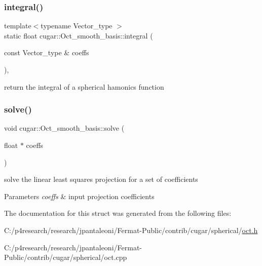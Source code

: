 \subsubsection{\texorpdfstring{integral()}{integral()}\hspace{0.1cm}{\footnotesize\ttfamily [2/2]}}
{\footnotesize\ttfamily template$<$typename Vector\+\_\+type $>$ \\
static float cugar\+::\+Oct\+\_\+smooth\+\_\+basis\+::integral (\begin{DoxyParamCaption}\item[{const Vector\+\_\+type \&}]{coeffs }\end{DoxyParamCaption})\hspace{0.3cm}{\ttfamily [inline]}, {\ttfamily [static]}}

return the integral of a spherical hamonics function \mbox{\label{structcugar_1_1_oct__smooth__basis_afae1fc0e9cb48f9f7e938830fb74b8e1}} 
\subsubsection{\texorpdfstring{solve()}{solve()}}
{\footnotesize\ttfamily void cugar\+::\+Oct\+\_\+smooth\+\_\+basis\+::solve (\begin{DoxyParamCaption}\item[{float $\ast$}]{coeffs }\end{DoxyParamCaption})\hspace{0.3cm}{\ttfamily [static]}}

solve the linear least squares projection for a set of coefficients


\begin{DoxyParams}{Parameters}
{\em coeffs} & input projection coefficients \\
\hline
\end{DoxyParams}


The documentation for this struct was generated from the following files\+:\begin{DoxyCompactItemize}
\item 
C\+:/p4research/research/jpantaleoni/\+Fermat-\/\+Public/contrib/cugar/spherical/\hyperlink{oct_8h}{oct.\+h}\item 
C\+:/p4research/research/jpantaleoni/\+Fermat-\/\+Public/contrib/cugar/spherical/oct.\+cpp\end{DoxyCompactItemize}
